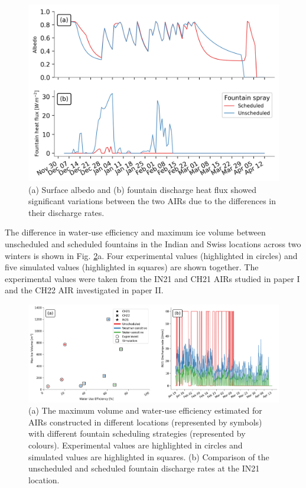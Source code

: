 \begin{figure}[htb]
	\includegraphics[width=\textwidth]{figs/dis_processes.png}
	\caption{(a) Surface albedo  and (b) fountain discharge heat flux showed significant variations between the two
		\ac{AIRs} due to the differences in their discharge rates.}
	\label{fig:dis_processes}
\end{figure}

The difference in water-use efficiency and maximum ice volume between unscheduled and scheduled fountains in the
Indian and Swiss locations across two winters is shown in Fig. \ref{fig:wue}a. Four experimental values
(highlighted in circles) and five simulated values (highlighted in squares) are shown together.  The
experimental values were taken from the IN21 and CH21 AIRs studied in paper I and the CH22 AIR investigated in
paper II.

\begin{figure}[htb]
	\includegraphics[width=\textwidth]{figs/wue.png}

	\caption{(a) The maximum volume and water-use efficiency estimated for AIRs constructed in different locations
		(represented by symbols) with different fountain scheduling strategies (represented by colours). Experimental
		values are highlighted in circles and simulated values are highlighted in squares. (b) Comparison of
		the unscheduled and scheduled fountain discharge rates at the IN21 location.}

	\label{fig:wue}
\end{figure}

